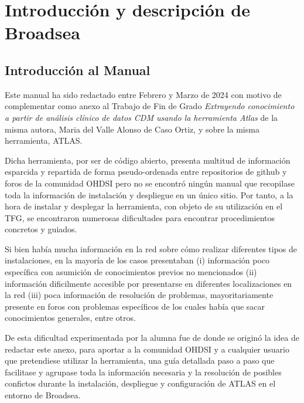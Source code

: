 \chapter{Introducción y descripción de Broadsea} \label{cap:Introduccion}

\section{Introducción al Manual} \label{cap:01IntroManual}

Este manual ha sido redactado entre Febrero y Marzo de 2024 con motivo de complementar como anexo al Trabajo de Fin de Grado \textit{Extrayendo conocimiento a partir de análisis clínico de datos CDM usando la herramienta Atlas}
de la misma autora, Maria del Valle Alonso de Caso Ortiz, y sobre la misma herramienta, ATLAS.


Dicha herramienta, por ser de código abierto, presenta multitud de información esparcida y repartida de forma pseudo-ordenada entre repositorios de github y foros de la comunidad OHDSI pero no se encontró ningún manual que recopilase toda la información de instalación y despliegue en un único sitio. Por tanto, a la hora de instalar y desplegar la herramienta, con objeto de su utilización en el TFG, se encontraron numerosas dificultades para encontrar procedimientos concretos y guiados.

Si bien había mucha información en la red sobre cómo realizar diferentes tipos de instalaciones, en la mayoría de los casos presentaban (i) información poco específica con asumición de conocimientos previos no mencionados (ii) información dificilmente accesible por presentarse en diferentes localizaciones en la red (iii) poca información de resolución de problemas, mayoritariamente presente en foros con problemas específicos de los cuales había que sacar conocimientos generales, entre otros.  

De esta dificultad experimentada por la alumna fue de donde se originó la idea de redactar este anexo, para aportar a la comunidad OHDSI y a cualquier usuario que pretendiese utilizar la herramienta, una guía detallada paso a paso que facilitase y agrupase toda la información necesaria y la resolución de posibles confictos durante la instalación, despliegue y configuración de ATLAS en el entorno de Broadsea. 

